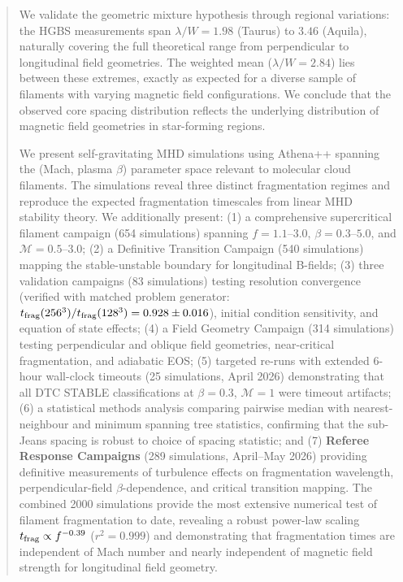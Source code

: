 \documentclass[twoside,twocolumn]{mnras}
\begin{document}
\begin{abstract}
We validate the geometric mixture hypothesis through regional variations: the HGBS measurements span $\lambda/W = 1.98$ (Taurus) to $3.46$ (Aquila), naturally covering the full theoretical range from perpendicular to longitudinal field geometries. The weighted mean ($\lambda/W = 2.84$) lies between these extremes, exactly as expected for a diverse sample of filaments with varying magnetic field configurations. We conclude that the observed core spacing distribution reflects the underlying distribution of magnetic field geometries in star-forming regions.

We present self-gravitating MHD simulations using Athena++ spanning the (Mach, plasma $\beta$) parameter space relevant to molecular cloud filaments. The simulations reveal three distinct fragmentation regimes and reproduce the expected fragmentation timescales from linear MHD stability theory. We additionally present: (1) a comprehensive supercritical filament campaign (654 simulations) spanning $f = 1.1$--$3.0$, $\beta = 0.3$--$5.0$, and $\mathcal{M} = 0.5$--$3.0$; (2) a Definitive Transition Campaign (540 simulations) mapping the stable-unstable boundary for longitudinal B-fields; (3) three validation campaigns (83 simulations) testing resolution convergence (verified with matched problem generator: $t_{\rm frag}(256^3)/t_{\rm frag}(128^3) = 0.928 \pm 0.016$), initial condition sensitivity, and equation of state effects; (4) a Field Geometry Campaign (314 simulations) testing perpendicular and oblique field geometries, near-critical fragmentation, and adiabatic EOS; (5) targeted re-runs with extended 6-hour wall-clock timeouts (25 simulations, April 2026) demonstrating that all DTC STABLE classifications at $\beta = 0.3$, $\mathcal{M} = 1$ were timeout artifacts; (6) a statistical methods analysis comparing pairwise median with nearest-neighbour and minimum spanning tree statistics, confirming that the sub-Jeans spacing is robust to choice of spacing statistic; and (7) \textbf{Referee Response Campaigns} (289 simulations, April--May 2026) providing definitive measurements of turbulence effects on fragmentation wavelength, perpendicular-field $\beta$-dependence, and critical transition mapping. The combined 2000 simulations provide the most extensive numerical test of filament fragmentation to date, revealing a robust power-law scaling $t_{\rm frag} \propto f^{-0.39}$ ($r^2 = 0.999$) and demonstrating that fragmentation times are independent of Mach number and nearly independent of magnetic field strength for longitudinal field geometry.
\end{abstract}
\end{document}
